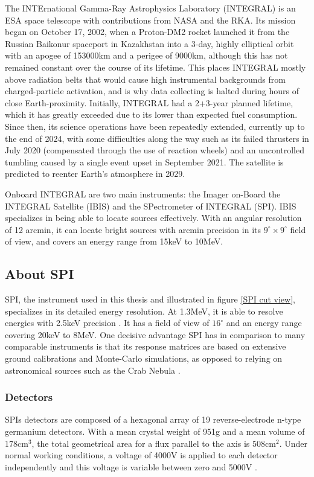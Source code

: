 \documentclass{report}
\begin{document}
The INTErnational Gamma-Ray Astrophysics Laboratory (INTEGRAL) is an ESA space telescope with contributions from NASA and the RKA. Its mission began on October 17, 2002, when a Proton-DM2 rocket launched it from the Russian Baikonur spaceport in Kazakhstan into a 3-day, highly elliptical orbit with an apogee of 153000km and a perigee of 9000km, although this has not remained constant over the course of its lifetime. This places INTEGRAL mostly above radiation belts that would cause high instrumental backgrounds from charged-particle activation, and is why data collecting is halted during hours of close Earth-proximity. Initially, INTEGRAL had a 2+3-year planned lifetime, which it has greatly exceeded due to its lower than expected fuel consumption. Since then, its science operations have been repeatedly extended, currently up to the end of 2024, with some difficulties along the way such as its failed thrusters in July 2020 (compensated through the use of reaction wheels) and an uncontrolled tumbling caused by a single event upset in September 2021. The satellite is predicted to reenter Earth's atmosphere in 2029.



Onboard INTEGRAL are two main instruments: the Imager on-Board the INTEGRAL Satellite (IBIS) and the SPectrometer of INTEGRAL (SPI). IBIS specializes in being able to locate sources effectively. With an angular resolution of 12 arcmin, it can locate bright sources with arcmin precision in its $9^\circ \times 9^\circ$ field of view, and covers an energy range from 15keV to 10MeV. 

\subsection{About SPI}




SPI, the instrument used in this thesis and illustrated in figure \ref{SPI cut view}, specializes in its detailed energy resolution. At 1.3MeV, it is able to resolve energies with 2.5keV precision \cite{refId0}. It has a field of view of $16^\circ$ and an energy range covering 20keV to 8MeV. One decisive advantage SPI has in comparison to many comparable instruments is that its response matrices are based on extensive ground calibrations and Monte-Carlo simulations, as opposed to relying on astronomical sources such as the Crab Nebula \cite{2020ApJ...899..131J}.





\subsubsection*{Detectors}
SPIs detectors are composed of a hexagonal array of 19 reverse-electrode n-type germanium detectors. With a mean crystal weight of 951g and a mean volume of $178\text{cm}^3$, the total geometrical area for a flux parallel to the axis is $508\text{cm}^2$. Under normal working conditions, a voltage of 4000V is applied to each detector independently and this voltage is variable between zero and 5000V \cite{refId0}.
\end{document}
